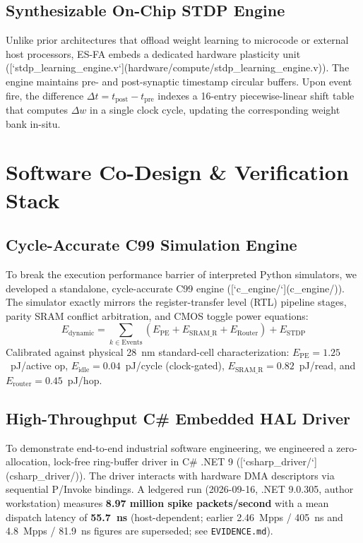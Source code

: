 \documentclass[journal]{IEEEtran}
\theoremstyle{definition}
\begin{document}
\subsection{Synthesizable On-Chip STDP Engine}
Unlike prior architectures that offload weight learning to microcode or external host processors, ES-FA embeds a dedicated hardware plasticity unit ([`stdp_learning_engine.v`](hardware/compute/stdp_learning_engine.v)). The engine maintains pre- and post-synaptic timestamp circular buffers. Upon event fire, the difference $\Delta t = t_{\text{post}} - t_{\text{pre}}$ indexes a 16-entry piecewise-linear shift table that computes $\Delta w$ in a single clock cycle, updating the corresponding weight bank in-situ.

\section{Software Co-Design \& Verification Stack}
\subsection{Cycle-Accurate C99 Simulation Engine}
To break the execution performance barrier of interpreted Python simulators, we developed a standalone, cycle-accurate C99 engine ([`c_engine/`](c_engine/)). The simulator exactly mirrors the register-transfer level (RTL) pipeline stages, parity SRAM conflict arbitration, and CMOS toggle power equations:
\begin{equation}
E_{\text{dynamic}} = \sum_{k \in \text{Events}} \left( E_{\text{PE}} + E_{\text{SRAM\_R}} + E_{\text{Router}} \right) + E_{\text{STDP}}
\end{equation}
Calibrated against physical 28~nm standard-cell characterization:
$E_{\text{PE}} = 1.25$~pJ/active op, $E_{\text{idle}} = 0.04$~pJ/cycle (clock-gated), $E_{\text{SRAM\_R}} = 0.82$~pJ/read, and $E_{\text{router}} = 0.45$~pJ/hop.

\subsection{High-Throughput C\# Embedded HAL Driver}
To demonstrate end-to-end industrial software engineering, we engineered a zero-allocation, lock-free ring-buffer driver in C\# .NET 9 ([`csharp_driver/`](csharp_driver/)). The driver interacts with hardware DMA descriptors via sequential P/Invoke bindings. A ledgered run (2026-09-16, .NET 9.0.305, author workstation) measures \textbf{8.97 million spike packets/second} with a mean dispatch latency of \textbf{55.7~ns} (host-dependent; earlier 2.46~Mpps / 405~ns and 4.8~Mpps / 81.9~ns figures are superseded; see \texttt{EVIDENCE.md}).
\end{document}
